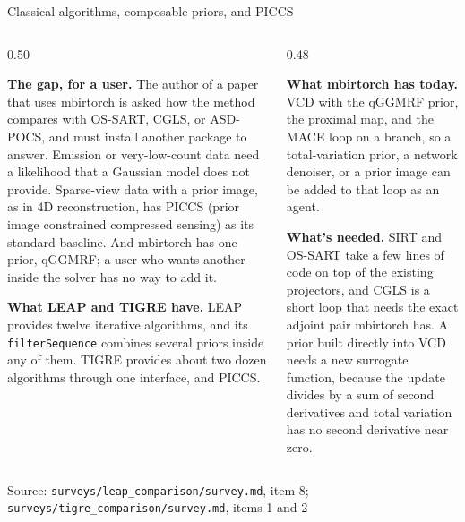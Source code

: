 \documentclass[aspectratio=169,10pt]{beamer}
\newcommand{\tagchip}[2]{{\setlength{\fboxsep}{2.5pt}\setlength{\fboxrule}{0.6pt}%
  \fcolorbox{white}{#1}{\textcolor{white}{\footnotesize\bfseries\strut #2}}}}
\newcommand{\leaprank}[1]{\tagchip{leapPurple}{LEAP #1}}
\newcommand{\tigrerank}[1]{\tagchip{tigreTeal}{TIGRE #1}}
\newcommand{\source}[1]{\par\vfill{\scriptsize\textcolor{inkGray}{Source: #1}\par}}
\newcommand{\head}[1]{\textbf{#1}}
\begin{document}
\begin{frame}{Classical algorithms, composable priors, and PICCS \hfill \leaprank{8}~\tigrerank{1, 2}}
  \begin{columns}[T]
    \begin{column}{0.50\textwidth}
      {\footnotesize
      \head{The gap, for a user.}  The author of a paper that uses mbirtorch
      is asked how the method compares with OS-SART, CGLS, or ASD-POCS, and
      must install another package to answer.  Emission or very-low-count
      data need a likelihood that a Gaussian model does not provide.
      Sparse-view data with a prior image, as in 4D reconstruction, has
      PICCS (prior image constrained compressed sensing) as its standard
      baseline.  And mbirtorch has one prior, qGGMRF; a user who wants
      another inside the solver has no way to add it.\par\vspace{5pt}
      \head{What LEAP and TIGRE have.}  LEAP provides twelve iterative
      algorithms, and its \texttt{filterSequence} combines several priors
      inside any of them.  TIGRE provides about two dozen algorithms through
      one interface, and PICCS.\par}
    \end{column}
    \begin{column}{0.48\textwidth}
      {\footnotesize
      \head{What mbirtorch has today.}  VCD with the qGGMRF prior, the
      proximal map, and the MACE loop on a branch, so a total-variation
      prior, a network denoiser, or a prior image can be added to that loop
      as an agent.\par\vspace{5pt}
      \head{What's needed.}  SIRT and OS-SART take a few lines of code on
      top of the existing projectors, and CGLS is a short loop that needs the
      exact adjoint pair mbirtorch has.  A prior built directly into VCD
      needs a new surrogate function, because the update divides by a sum of
      second derivatives and total variation has no second derivative near
      zero.\par}
    \end{column}
  \end{columns}
  \source{\texttt{surveys/leap\_comparison/survey.md}, item 8; \texttt{surveys/tigre\_comparison/survey.md}, items 1 and 2}
\end{frame}
\end{document}
